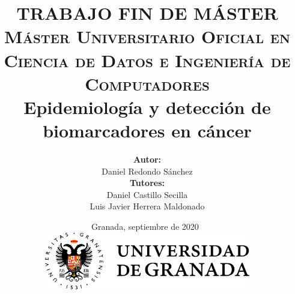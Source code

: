 \documentclass[a4paper, 12pt]{book}
\begin{document}
 \pagestyle{fancyplain}
 \lhead[\fancyplain{}{\small\bf\thepage}]{\fancyplain{}{\small\bf\rightmark}}
 \rhead[\fancyplain{}{\small\bf\leftmark}]{\fancyplain{}{\small\bf\thepage}}
 \cfoot[\fancyplain{\small\bf\thepage}{}]{\fancyplain{\small\bf\thepage}{}}

\author{\textbf{Autor:}\vspace{-0.1cm}\\ Daniel Redondo Sánchez \vspace{0.2cm}\\
\textbf{Tutores:}\vspace{0.1cm}\\
Daniel Castillo Secilla\\
Luis Javier Herrera Maldonado
}
	
\title{
	\vspace{-4cm}
	\centering
	{\Large TRABAJO FIN DE MÁSTER\\} \vspace{0.3cm}
	{\large \textsc{Máster Universitario Oficial en Ciencia de Datos e Ingeniería de Computadores\\}}
		{\LARGE \textbf{\bfseries{Epidemiología y detección de biomarcadores en cáncer\\}}}
		\vspace{-0.75cm}
}


\date{\vspace{1cm}
	Granada, septiembre de 2020 \\
	\vspace{0.5cm}
	\includegraphics[height=2.5cm]{logos/ugr.png} \\ 
}
	
	\mainmatter
	\maketitle
	\thispagestyle{empty}
	
	\null \newpage
    \thispagestyle{empty}
	\newpage
	
	\newpage
	\thispagestyle{empty}
	
\end{document}
